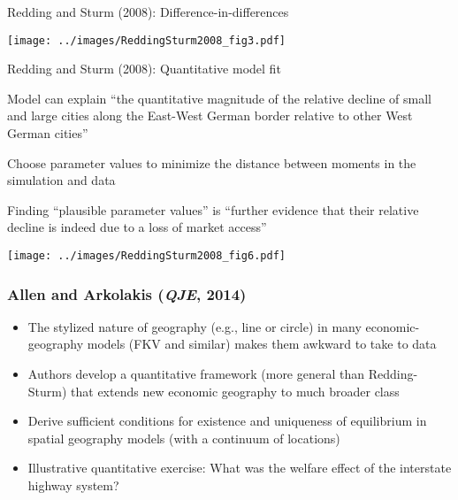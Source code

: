 \documentclass[10pt,notes=hide]{beamer}
\begin{document}
\begin{frame}{Redding and Sturm (2008): Difference-in-differences}
\begin{center}
\texttt{[image: ../images/ReddingSturm2008\_fig3.pdf]}
\end{center}
\end{frame}
\begin{frame}{Redding and Sturm (2008): Quantitative model fit}
\begin{itemize}
	{\small
	\item Model can explain ``the quantitative magnitude of the relative decline of small and large cities along the East-West German border relative to other West German cities''
	\item Choose parameter values to minimize the distance between moments in the simulation and data
	\item Finding ``plausible parameter values'' is ``further evidence that their relative decline is indeed due to a loss of market access''
	}
\end{itemize}
\begin{center}
\texttt{[image: ../images/ReddingSturm2008\_fig6.pdf]}
\end{center}
\end{frame}
\begin{frame}
\frametitle{Allen and Arkolakis (\textit{QJE}, 2014)}
\begin{itemize}
\item The stylized nature of geography (e.g., line or circle) in many economic-geography models (FKV and similar) makes them awkward to take to data
\item Authors develop a quantitative framework (more general than Redding-Sturm) that extends new economic geography to much broader class
\item Derive sufficient conditions for existence and uniqueness of equilibrium in spatial geography models (with a continuum of locations)
\item Illustrative quantitative exercise: What was the welfare effect of the interstate highway system?
\end{itemize}
\end{frame}
\end{document}

